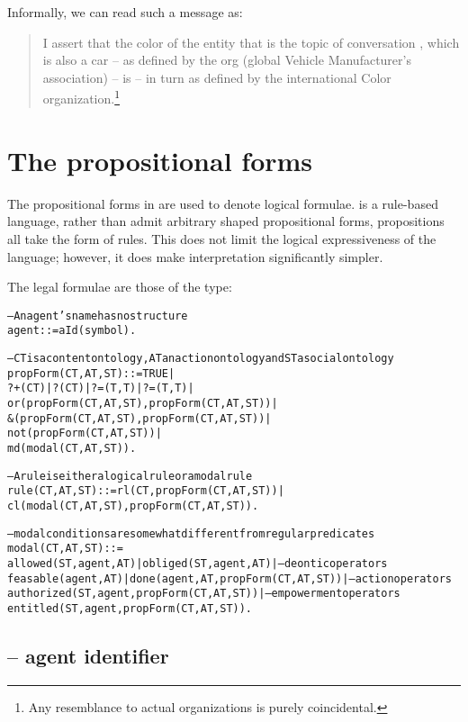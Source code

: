 Informally, we can read such a message as:
\begin{quote}
I assert that the color of the entity that is the topic of conversation , which is also a car -- as defined by the  org (global Vehicle Manufacturer's association) -- is  -- in turn as defined by the international Color organization.\footnote{Any resemblance to actual organizations is purely coincidental.}
\end{quote}

\section{The propositional forms}
\label{gcl:propositional}

The propositional forms in are used to denote logical formulae. \gcl is a rule-based language, rather than admit arbitrary shaped propositional forms, \gcl propositions all take the form of rules. This does not limit the logical expressiveness of the language; however, it does make interpretation significantly simpler.

The legal formulae are those of the  type:
\begin{alltt}
-- An agent's name has no structure
agent ::= aId(symbol).


-- CT is a content ontology, AT an action ontology and ST a social ontology
propForm(CT,AT,ST) ::=  TRUE |
		?+(CT)  | ?\nasf(CT) | ?=(T,T) | ?\bsl{}=(T,T) |
       or(propForm(CT,AT,ST),propForm(CT,AT,ST)) | 
		&(propForm(CT,AT,ST),propForm(CT,AT,ST)) | 
		not(propForm(CT,AT,ST)) | 
	    md(modal(CT,AT,ST)).

-- A rule is either a logical rule or a modal rule
rule(CT,AT,ST) ::= rl(CT,propForm(CT,AT,ST)) |
       cl(modal(CT,AT,ST),propForm(CT,AT,ST)).

-- modal conditions are somewhat different from regular predicates
  modal(CT,AT,ST) ::= 
    allowed(ST,agent,AT) | obliged(ST,agent,AT) |    -- deontic operators
    feasable(agent,AT) | done(agent,AT,propForm(CT,AT,ST)) |       -- action operators
    authorized(ST,agent,propForm(CT,AT,ST)) |        -- empowerment operators
    entitled(ST,agent,propForm(CT,AT,ST)).
\end{alltt}

\subsection{ -- agent identifier}
\label{gcl:aid}


